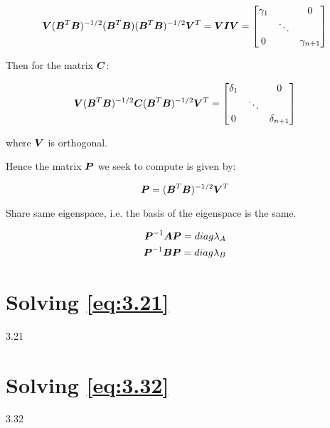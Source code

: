 \begin{equation} \label{eq:A.10}
\BV(\BB^{T}\BB)^{-1/2}(\BB^{T}\BB)(\BB^{T}\BB)^{-1/2}\BV^{T} = \BV\BI\BV = \begin{bmatrix}
\gamma_1 & & 0 \\
 & \ddots & \\
0 & & \gamma_{n+1}
\end{bmatrix}
\end{equation}

Then for the matrix $\BC$:

\begin{equation} \label{eq:A.11}
\BV(\BB^{T}\BB)^{-1/2}\BC(\BB^{T}\BB)^{-1/2}\BV^{T} = \begin{bmatrix}
\delta_1 & & 0 \\
 & \ddots & \\
0 & & \delta_{n+1}
\end{bmatrix}
\end{equation}

where $\BV$ is orthogonal.

Hence the matrix $\BP$ we seek to compute is given by:

\begin{equation} \label{eq:A.12}
\BP = (\BB^T\BB)^{-1/2}\BV^T
\end{equation}

Share same eigenspace, i.e. the basis of the eigenspace is the same.

\begin{eqnarray}
\BP^{-1}\BA\BP = diag{\lambda_A} \\
\nonumber
\BP^{-1}\BB\BP = diag{\lambda_B}
\end{eqnarray}

\section{Solving \ref{eq:3.21}}

3.21

\section{Solving \ref{eq:3.32}}

3.32
